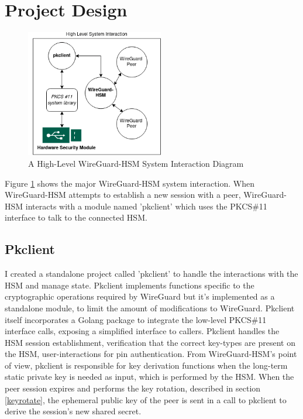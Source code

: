 \documentclass [11pt, proquest] {uwthesis}[2020/02/24]
\begin{document}
\section{Project Design}
\begin{figure}
\centering
\includegraphics[width=6cm]{paper/images/high-level-overview.png}
\caption{A High-Level WireGuard-HSM System Interaction Diagram}
\label{fig:highlevel_system}
\end{figure}

Figure \ref{fig:highlevel_system} shows the major WireGuard-HSM system interaction. When WireGuard-HSM attempts to establish a new session with a peer, WireGuard-HSM interacts with a module named 'pkclient' which uses the PKCS\#11 interface to talk to the connected HSM. 

\subsection{Pkclient}
\label{pk_design}
I created a standalone project called 'pkclient' to handle the interactions with the HSM and manage state. Pkclient implements functions specific to the cryptographic operations required by WireGuard but it's implemented as a standalone module, to limit the amount of modifications to WireGuard. Pkclient itself incorporates a Golang package to integrate the low-level PKCS\#11 interface calls, exposing a simplified interface to callers.  Pkclient handles the HSM session establishment, verification that the correct key-types are present on the HSM, user-interactions for pin authentication. 
From WireGuard-HSM's point of view, pkclient is responsible for key derivation functions when the long-term static private key is needed as input, which is performed by the HSM. When the peer session expires and performs the key rotation, described in section \ref{keyrotate}, the ephemeral public key of the peer is sent in a call to pkclient to derive the session's new shared secret. 
\end{document}
